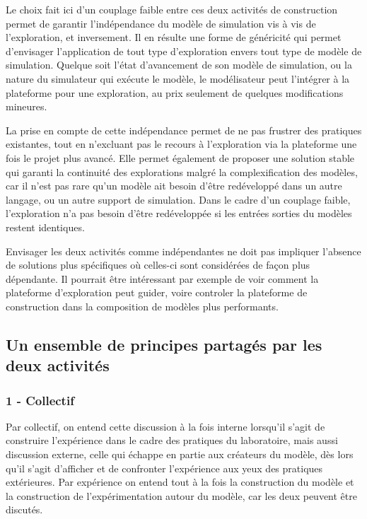 
Le choix fait ici d'un couplage faible entre ces deux activités de construction permet de garantir l'indépendance du modèle de simulation vis à vis de l'exploration, et inversement. Il en résulte une forme de généricité qui permet d'envisager l'application de tout type d'exploration envers tout type de modèle de simulation. Quelque soit l'état d'avancement de son modèle de simulation, ou la nature du simulateur qui exécute le modèle, le modélisateur peut l'intégrer à la plateforme pour une exploration, au prix seulement de quelques modifications mineures.

La prise en compte de cette indépendance permet de ne pas frustrer des pratiques existantes, tout en n'excluant pas le recours à l'exploration via la plateforme une fois le projet plus avancé. Elle permet également de proposer une solution stable qui garanti la continuité des explorations malgré la complexification des modèles, car il n'est pas rare qu'un modèle ait besoin d'être redéveloppé dans un autre langage, ou un autre support de simulation. Dans le cadre d'un couplage faible, l'exploration n'a pas besoin d'être redéveloppée si les entrées sorties du modèles restent identiques.

Envisager les deux activités comme indépendantes ne doit pas impliquer l'absence de solutions plus spécifiques où celles-ci sont considérées de façon plus dépendante. Il pourrait être intéressant par exemple de voir comment la plateforme d'exploration peut guider, voire controler la plateforme de construction dans la composition de modèles plus performants.

\subsection{Un ensemble de principes partagés par les deux activités}

\subsubsection{1 - Collectif}

Par collectif, on entend cette discussion à la fois interne lorsqu'il s'agit de construire l'expérience dans le cadre des pratiques du laboratoire, mais aussi discussion externe, celle qui échappe en partie aux créateurs du modèle, dès lors qu'il s'agit d'afficher et de confronter l'expérience aux yeux des pratiques extérieures. Par expérience on entend tout à la fois la construction du modèle et la construction de l'expérimentation autour du modèle, car les deux peuvent être discutés.

